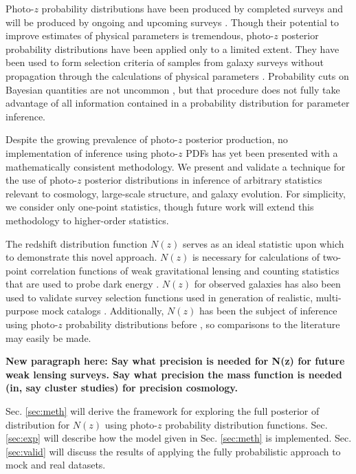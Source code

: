 \documentclass[preprint]{aastex}
\begin{document}
Photo-$z$ probability distributions have been produced by completed surveys 
\citep{Hildebrandt2012, Sheldon2012} and will be produced by ongoing and 
upcoming surveys \citep{LSSTScienceCollaboration2009, CarrascoKind2014a, 
Bonnett2015, Masters2015}.  Though their potential to improve estimates of 
physical parameters is tremendous, photo-$z$ posterior probability 
distributions have been applied only to a limited extent.  They have been used 
to form selection criteria of samples from galaxy surveys without propagation 
through the calculations of physical parameters 
\citep{VanBreukelen2009,Viironen2015}.  Probability cuts on Bayesian quantities 
are not uncommon \citep{Leung2015, DiPompeo2015a}, but that procedure does not 
fully take advantage of all information contained in a probability distribution 
for parameter inference.  

Despite the growing prevalence of photo-$z$ posterior production, no 
implementation of inference using photo-$z$ PDFs has yet been presented with a 
mathematically consistent methodology.  We present and validate a technique for 
the use of photo-$z$ posterior distributions in inference of arbitrary 
statistics relevant to cosmology, large-scale structure, and galaxy evolution.  
For simplicity, we consider only one-point statistics, though future work will 
extend this methodology to higher-order statistics.

The redshift distribution function $N(z)$ serves as an ideal statistic upon 
which to demonstrate this novel approach.  $N(z)$ is necessary for calculations 
of two-point correlation functions of weak gravitational lensing and counting 
statistics that are used to probe dark energy \citep{Masters2015}.  $N(z)$ for 
observed galaxies has also been used to validate survey selection functions 
used in generation of realistic, multi-purpose mock catalogs 
\citep{Norberg2002}.  Additionally, $N(z)$ has been the subject of inference 
using photo-$z$ probability distributions before \citep{Sheldon2012, 
Hildebrandt2012, Kelly2014, Benjamin2013, Bonnett2015a, Viironen2015, 
Asorey2016, Leistedt2016}, so comparisons to the literature may easily be made. 
 

\textbf{New paragraph here: Say what precision is needed for N(z) for future 
weak lensing surveys. Say what precision the mass function is needed (in, say 
cluster studies) for precision cosmology.}

Sec. \ref{sec:meth} will derive the framework for exploring the full posterior 
of distribution for $N(z)$ using photo-$z$ probability distribution functions.  
Sec. \ref{sec:exp} will describe how the model given in Sec. \ref{sec:meth} is 
implemented.  Sec. \ref{sec:valid} will discuss the results of applying the 
fully probabilistic approach to mock and real datasets.
\end{document}

